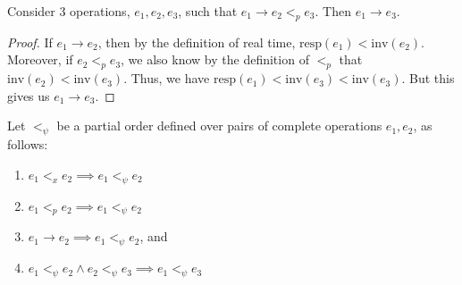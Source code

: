 \begin{lem}
\label{lemma5}
Consider 3 operations, $e_1, e_2, e_3$, such that $e_1 \rightarrow e_2 <_p e_3$. Then $e_1 \rightarrow e_3$.
\end{lem}
\begin{proof}
    If $e_1 \rightarrow e_2$, then by the definition of real time, $\text{resp}(e_1) < \text{inv}(e_2)$. Moreover, if $e_2 <_p e_3$, we also know by the definition of $<_p$ that $\text{inv}(e_2) < \text{inv}(e_3)$. Thus, we have $\text{resp}(e_1) < \text{inv}(e_3) < \text{inv}(e_3)$. But this gives us $e_1 \rightarrow e_3$.
\end{proof}

Let $<_\psi$ be a partial order defined over pairs of complete operations $e_1, e_2$, as follows:
\begin{enumerate}
    \item $e_1 <_x e_2 \implies e_1 <_\psi e_2$
    \item $e_1 <_p e_2 \implies e_1 <_\psi e_2$
    \item $e_1 \rightarrow e_2 \implies e_1 <_\psi e_2$, and
    \item $e_1 <_\psi e_2 \land e_2 <_\psi e_3 \implies e_1 <_\psi e_3$
\end{enumerate}

